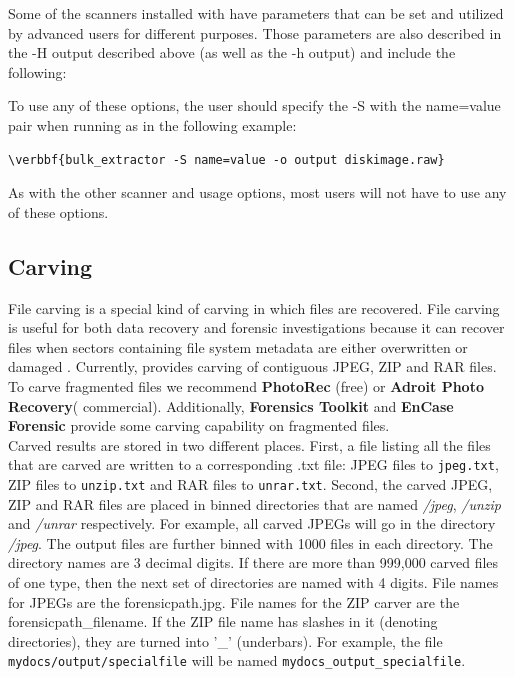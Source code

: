 \documentclass[11pt]{article} %
\begin{document}
Some of the scanners installed with \bulk have parameters that can be set and utilized by advanced users for different purposes. Those parameters are also described in the -H output described above (as well as the -h output) and include the following:
\begingroup
\footnotesize
{
\selectfont

}
\endgroup

To use any of these options, the user should specify the -S with the name=value pair when running \bulk as in the following example:
\begin{Verbatim}[commandchars=\\\{\}]
\verbbf{bulk_extractor -S name=value -o output diskimage.raw}
\end{Verbatim} 
As with the other scanner and \bulk usage options, most users will not have to use any of these options. 

\subsection{Carving}
\label{carving}

File carving is a special kind of carving in which files are recovered. File carving is useful for both data recovery and forensic investigations because it can recover files when sectors containing file system metadata are either overwritten or damaged \cite{digitalmediatriage}. Currently, \bulk provides carving of contiguous JPEG, ZIP and RAR files. To carve fragmented files we recommend \textbf{PhotoRec} (free) or \textbf{Adroit Photo Recovery}( commercial). Additionally, \textbf{Forensics Toolkit} and \textbf{EnCase Forensic} provide some carving capability on fragmented files.\\

Carved results are stored in two different places. First, a file listing all the files that are carved are written to a corresponding .txt file: JPEG files to \texttt{jpeg.txt}, ZIP files to \texttt{unzip.txt} and RAR files to \texttt{unrar.txt}. Second, the carved JPEG, ZIP and RAR files are placed in binned directories that are named \textit{/jpeg}, \textit{/unzip} and \textit{/unrar} respectively. For example, all carved JPEGs will go in the directory \textit{/jpeg}. The output files are further binned with 1000 files in each directory. The directory names are 3 decimal digits. If there are more than 999,000 carved files of one type, then the next set of directories are named with 4 digits. File names for JPEGs are the forensicpath.jpg. File names for the ZIP carver are the forensicpath\_filename. If the ZIP file name has slashes in it (denoting directories), they are turned into '\_' (underbars). For example, the file \texttt{mydocs/output/specialfile} will be named \texttt{mydocs\_output\_specialfile}. \\
\end{document}
